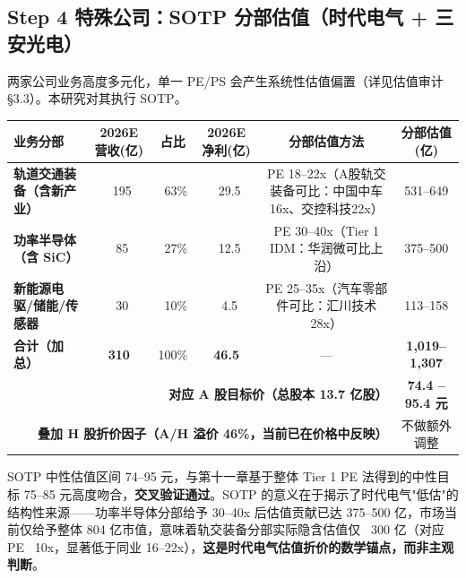 \subsection{Step 4 特殊公司：SOTP 分部估值（时代电气 + 三安光电）}

两家公司业务高度多元化，单一 PE/PS 会产生系统性估值偏置（详见估值审计 §3.3）。本研究对其执行 SOTP。

\begin{exhibitbox}
\centering
\small
\begin{tabularx}{\textwidth}{X c c c c c}
\toprule
\textbf{业务分部} & \textbf{2026E 营收(亿)} & \textbf{占比} & \textbf{2026E 净利(亿)} & \textbf{分部估值方法} & \textbf{分部估值(亿)} \\
\midrule
\rowcolor{navy!5}
\textbf{轨道交通装备（含新产业）} & ~195 & ~63\% & ~29.5 & PE 18–22x（A股轨交装备可比：中国中车16x、交控科技22x） & 531–649 \\
\midrule
\rowcolor{accentblue!5}
\textbf{功率半导体（含 SiC）} & ~85 & ~27\% & ~12.5 & PE 30–40x（Tier 1 IDM：华润微可比上沿） & 375–500 \\
\midrule
\rowcolor{riskamber!5}
\textbf{新能源电驱/储能/传感器} & ~30 & ~10\% & ~4.5 & PE 25–35x（汽车零部件可比：汇川技术28x） & 113–158 \\
\midrule
\textbf{合计（加总）} & \textbf{310} & 100\% & \textbf{46.5} & — & \textbf{1,019–1,307} \\
\midrule
\midrule
\multicolumn{5}{r}{\textbf{对应 A 股目标价（总股本 13.7 亿股）}} & \textbf{74.4 – 95.4 元} \\
\multicolumn{5}{r}{\textbf{叠加 H 股折价因子（A/H 溢价 46\%，当前已在价格中反映）}} & 不做额外调整 \\
\bottomrule
\end{tabularx}
\end{exhibitbox}

SOTP 中性估值区间 74–95 元，与第十一章基于整体 Tier 1 PE 法得到的中性目标 75–85 元高度吻合，\textbf{交叉验证通过}。SOTP 的意义在于揭示了时代电气"低估"的结构性来源——功率半导体分部给予 30–40x 后估值贡献已达 375–500 亿，市场当前仅给予整体 804 亿市值，意味着轨交装备分部实际隐含估值仅 ~300 亿（对应 PE ~10x，显著低于同业 16–22x），\textbf{这是时代电气估值折价的数学锚点，而非主观判断}。

